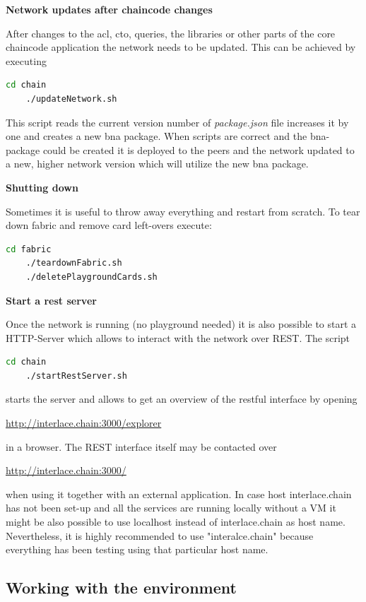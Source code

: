 \textbf{Network updates after chaincode changes}

After changes to the acl, cto, queries, the libraries or other parts of the core chaincode application the network needs to be updated. This can be achieved by executing

\begin{lstlisting}[language=bash]
	cd chain
	./updateNetwork.sh
\end{lstlisting}

This script reads the current version number of \textit{package.json} file increases it by one and creates a new bna package. When scripts are correct and the bna-package could be created it is deployed to the peers and the network updated to a new, higher network version which will utilize the new bna package.

\textbf{Shutting down}

Sometimes it is useful to throw away everything and restart from scratch. To tear down fabric and remove card left-overs execute:

\begin{lstlisting}[language=bash]
	cd fabric
	./teardownFabric.sh
	./deletePlaygroundCards.sh
\end{lstlisting}

\textbf{Start a rest server}

Once the network is running (no playground needed) it is also possible to start a HTTP-Server which allows to interact with the network over REST. The script

\begin{lstlisting}[language=bash]
	cd chain
	./startRestServer.sh
\end{lstlisting}

starts the server and allows to get an overview of the restful interface by opening

\url{http://interlace.chain:3000/explorer}

in a browser. The REST interface itself may be contacted over

\url{http://interlace.chain:3000/}

when using it together with an external application. In case host interlace.chain has not been set-up and all the services are running locally without a VM it might be also possible to use localhost instead of interlace.chain as host name. Nevertheless, it is highly recommended to use "interalce.chain" because everything has been testing using that particular host name.

\subsection{Working with the environment}

